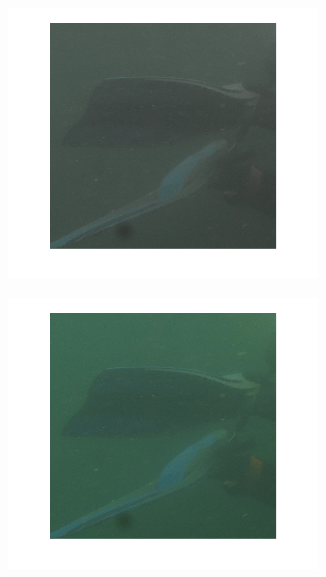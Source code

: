 \documentclass{article}
\begin{document}
\begin{figure}[H]
\begin{subfigure}{0.5\textwidth}
    \end{subfigure}\hfill
	\begin{subfigure}{0.5\textwidth}
	\centering
        \includegraphics[width=0.9\textwidth]{transf2.png}
    \end{subfigure}\hfill
	\begin{subfigure}{0.5\textwidth}
	\centering
        \includegraphics[width=0.9\textwidth]{transformacionLog.png}
    \end{subfigure}\hfill
	\begin{subfigure}{0.5\textwidth}

\end{subfigure}
\end{figure}
\end{document}
